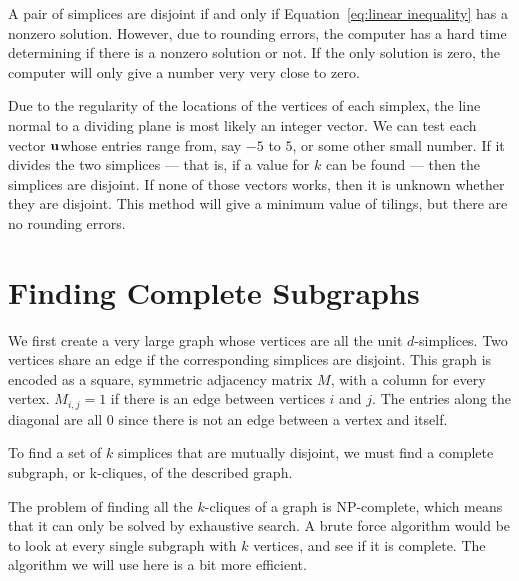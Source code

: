 \documentclass[12pt]{scrippsthesis}
\theoremstyle{definition}
\theoremstyle{remark}
\theoremstyle{plain}
\begin{document}

A pair of simplices are disjoint if and only if Equation~\ref{eq:linear inequality} has a nonzero solution.  However, due to rounding errors, the computer has a hard time determining if there is a nonzero solution or not.  If the only solution is zero, the computer will only give a number very very close to zero.

Due to the regularity of the locations of the vertices of each simplex, the line normal to a dividing plane is most likely an integer vector.  We can test each vector ${\bf u}$whose entries range from, say $-5$ to $5$, or some other small number.  If it divides the two simplices --- that is, if a value for $k$ can be found --- then the simplices are disjoint.  If none of those vectors works, then it is unknown whether they are disjoint.  This method will give a minimum value of tilings, but there are no rounding errors.

\section{Finding Complete Subgraphs}

We first create a very large graph whose vertices are all the unit $d$-simplices.  Two vertices share an edge if the corresponding simplices are disjoint.  This graph is encoded as a square, symmetric adjacency matrix $M$, with a column for every vertex.  $M_{i,j}=1$ if there is an edge between vertices $i$ and $j$.  The entries along the diagonal are all $0$ since there is not an edge between a vertex and itself.


To find a set of $k$ simplices that are mutually disjoint, we must find a complete subgraph, or k-cliques, of the described graph.  


The problem of finding all the $k$-cliques of a graph is NP-complete, which means that it can only be solved by exhaustive search.  A brute force algorithm would be to look at every single subgraph with $k$ vertices, and see if it is complete.  The algorithm we will use here is a bit more efficient.
\end{document}
